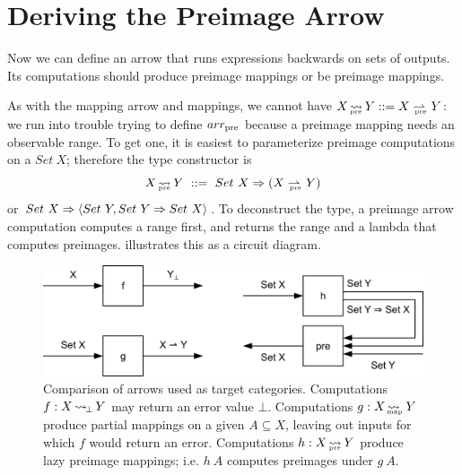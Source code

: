 
\section{Deriving the Preimage Arrow}
\label{sec:preimage-arrow}

Now we can define an arrow that runs expressions backwards on sets of outputs.
Its computations should produce preimage mappings or be preimage mappings.

As with the mapping arrow and mappings, we cannot have $X \preto Y ::= X \prepto Y$: we run into trouble trying to define $arr_\mathrm{pre}$ because a preimage mapping needs an observable range.
To get one, it is easiest to parameterize preimage computations on a $Set~X$; therefore the  type constructor is
\begin{equation}
	X \preto Y \ ::= \ Set~X \tto (X \prepto Y)
\end{equation}
or $Set~X \Rightarrow \langle{Set~Y, Set~Y \Rightarrow Set~X}\rangle$.
To deconstruct the type, a preimage arrow computation computes a range first, and returns the range and a lambda that computes preimages.
 illustrates this as a circuit diagram.

\begin{figure}[tb!]\centering
\includegraphics[width=5.5in]{figures/preimage-arrow-diagram}
\caption[Comparison of arrows used as target categories]{Comparison of arrows used as target categories. Computations $f : X \operatorname{\rightsquigarrow_{\mspace{-3mu}\bot}} Y$ may return an error value $\bot$. Computations $g : X \operatorname{\rightsquigarrow_{\mspace{-23mu}_\mathrm{map}}} Y$ produce partial mappings on a given $A \subseteq X$, leaving out inputs for which $f$ would return an error. Computations $h : X \operatorname{\rightsquigarrow_{\mspace{-22mu}_\mathrm{pre}}} Y$ produce lazy preimage mappings; i.e. $h~A$ computes preimages under $g~A$.}
\label{fig:arrow-diagram}
\end{figure}

